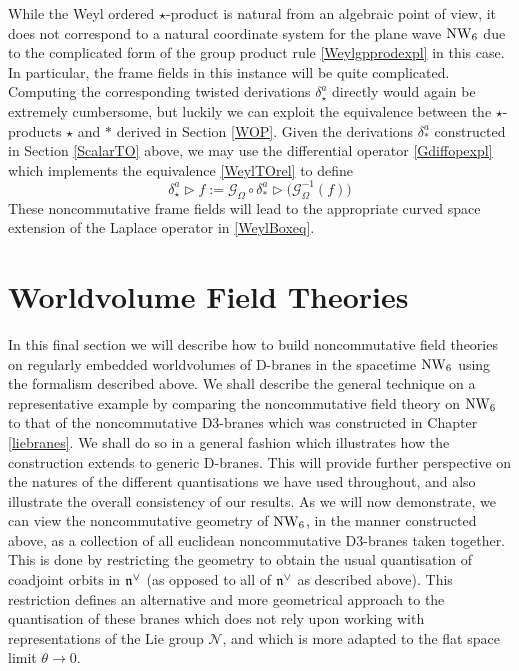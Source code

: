 While the Weyl ordered $\star$-product is natural from an algebraic point of
view, it does not correspond to a natural coordinate system for the plane wave
$\operatorname{NW}_6$ due to the complicated form of the group product rule
\eqref{Weylgpprodexpl} in this case. In particular, the frame fields in this
instance will be quite complicated. Computing the corresponding twisted
derivations $\delta^a_\star$ directly would again be extremely cumbersome, but
luckily we can exploit the equivalence between the $\star$-products $\star$ and
$*$ derived in Section \ref{WOP}. Given the derivations $\delta^a_*$ constructed
in Section \ref{ScalarTO} above, we may use the differential operator
\eqref{Gdiffopexpl} which implements the equivalence \eqref{WeylTOrel} to define
\begin{equation}
  \label{Weyldelta}
  \delta^a_\star\triangleright f:=\mathcal{G}^{ }_\Omega\circ
  \delta^a_*\triangleright\bigl(\mathcal{G}_\Omega^{-1}(f)\bigr)  
\end{equation}
These noncommutative frame fields will lead to the appropriate curved space
extension of the Laplace operator in \eqref{WeylBoxeq}.

\section{Worldvolume Field Theories}
\label{D3Branes}
In this final section we will describe how to build noncommutative field
theories on regularly embedded worldvolumes of D-branes in the spacetime $\operatorname{NW}_6$
using the formalism described above. We shall describe the general technique on
a representative example by comparing the noncommutative field theory on $\operatorname{NW}_6$
to that of the noncommutative D3-branes which was constructed in Chapter
\ref{liebranes}. We shall do so in a general fashion which illustrates how the
construction extends to generic D-branes. This will provide further perspective
on the natures of the different quantisations we have used throughout, and also
illustrate the overall consistency of our results. As we will now demonstrate,
we can view the noncommutative geometry of $\operatorname{NW}_6$, in the manner constructed
above, as a collection of all euclidean noncommutative D3-branes taken together.
This is done by restricting the geometry to obtain the usual quantisation of
coadjoint orbits in ${\mathfrak n}^\vee$ (as opposed to all of ${\mathfrak n}^\vee$ as described above).
This restriction defines an alternative and more geometrical approach to the
quantisation of these branes which does not rely upon working with
representations of the Lie group $\mathcal{N}$, and which is more adapted to the
flat space limit $\theta\to0$.


